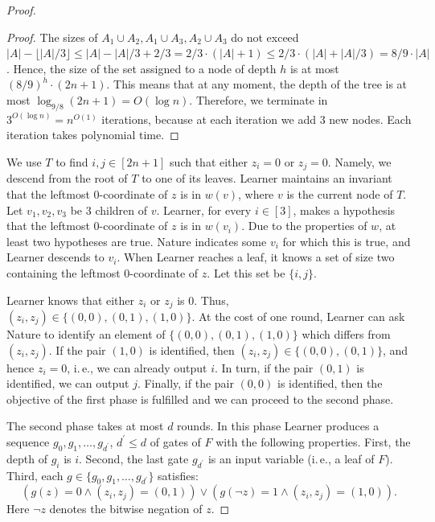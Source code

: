 \documentclass[11pt]{article}
\numberwithin{equation}{section}
\theoremstyle{definition}
\theoremstyle{plain}
\newcommand{\ie}{i.\,e.}
\begin{document}
\begin{proof}
\begin{proof}
The sizes of $A_1\cup A_2, A_1 \cup A_3, A_2 \cup A_3$ do not exceed $|A| - \lfloor |A|/3\rfloor \le |A| - |A|/3 + 2/3 = 2/3 \cdot(|A| + 1) \le 2/3 \cdot(|A| + |A|/3) = 8/9\cdot |A|$. Hence, the size of the set assigned to a node of depth $h$ is at most $\left(8/9\right)^h \cdot (2n + 1)$.  This means that at any moment, the depth of the tree is at most $\log_{9/8}(2n + 1) = O(\log n)$. Therefore, we terminate in $3^{O(\log n)} = n^{O(1)}$ iterations, because at each iteration we add $3$ new nodes. Each iteration takes polynomial time.  
\end{proof}

We use $T$ to find %
%
%
$i, j\in [2n + 1]$ such that either $z_i = 0$ or $z_j = 0$. Namely, we descend from the root of $T$ to one of its 
%
leaves.  %
Learner maintains an invariant that the leftmost $0$-coordinate of $z$ is in $w(v)$, where $v$ is the current node of $T$. Let $v_1, v_2, v_3$ be $3$ children of $v$. Learner, for every $i\in [3]$, makes a hypothesis that the leftmost $0$-coordinate of $z$ is in $w(v_i)$. Due to the properties of $w$, at least two hypotheses are true. Nature indicates some $v_i$ for which this is true, and Learner descends to $v_i$. When Learner reaches a leaf, it 
%
knows a set of size two containing the leftmost $0$-coordinate of $z$. 
Let this set be $\{i,j\}$. 





Learner knows that either $z_i$ or $z_j$ is $0$. Thus, $(z_i,z_j) \in\{(0,0), (0,1), (1,0)\}$. At the cost of one round,
%
Learner %
can ask Nature to identify an element of $\{(0,0), (0,1), (1,0)\}$ which differs from $(z_i,z_j)$. If the pair $(1,0)$ is identified, then $(z_i,z_j) \in \{(0,0), (0,1)\}$, and hence $z_i = 0$, \ie, we can already output $i$. In turn, if the pair $(0,1)$ is identified, we can output $j$. Finally, if the pair $(0,0)$ is identified, then the objective of the first phase is fulfilled and we can proceed to the second phase.

The second phase takes at most $d$ rounds. In this phase Learner produces a sequence $g_0, g_1, \ldots, g_{d^\prime}$, $d^\prime \le d$ of gates of $F$ with the following properties. First, the depth of $g_i$ is $i$. Second, the last gate $g_{d^\prime}$ is an input variable (\ie, a leaf of $F$). Third, each $g\in\{g_0, g_1, \ldots, g_{d^\prime}\}$ satisfies:
\begin{equation}
\label{maj_invariant}
\left(g(z) = 0 \land (z_i,z_j) = (0,1) \right) \lor \left( g(\lnot z)  = 1 \land (z_i,z_j) = (1,0)\right).
\end{equation}
Here $\lnot z$ denotes the %
bitwise  %
negation of $z$. 


\end{proof}
\end{document}
